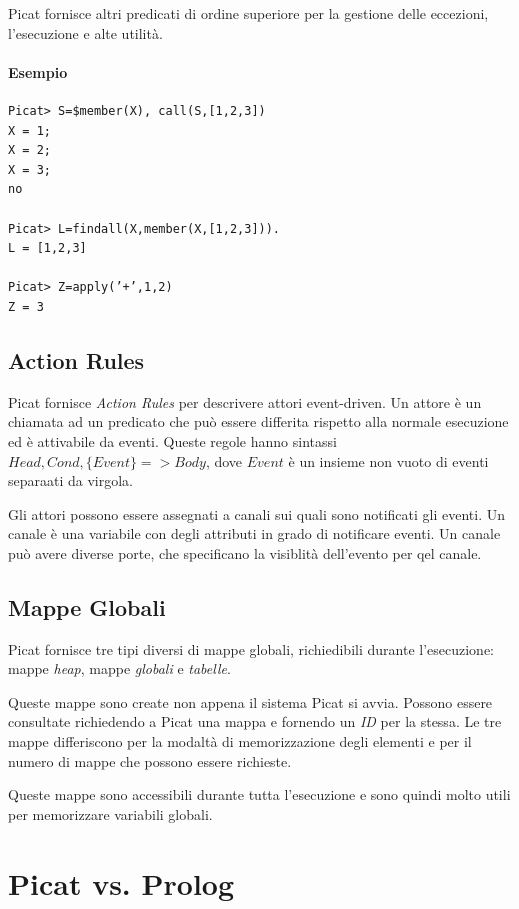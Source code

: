 \documentclass[12pt,a4paper,openright]{book} %
\begin{document}
Picat fornisce altri predicati di ordine superiore per la gestione delle eccezioni, l'esecuzione e alte utilità.

\paragraph{Esempio}
\begin{verbatim}
Picat> S=$member(X), call(S,[1,2,3])
X = 1;
X = 2;
X = 3;
no

Picat> L=findall(X,member(X,[1,2,3])).
L = [1,2,3]

Picat> Z=apply(’+’,1,2)
Z = 3
\end{verbatim}

\subsection{Action Rules}
\label{sec:picat_advanced_actionrules}

Picat fornisce \emph{Action Rules} per descrivere attori event-driven. Un attore è un chiamata ad un predicato che può essere differita rispetto alla normale esecuzione ed è attivabile da eventi. Queste regole hanno sintassi $Head, Cond, \{Event\} => Body$, dove $Event$ è un insieme non vuoto di eventi separaati da virgola.

Gli attori possono essere assegnati a canali sui quali sono notificati gli eventi. Un canale è una variabile con degli attributi in grado di notificare eventi. Un canale può avere diverse porte, che specificano la visiblità dell'evento per qel canale. 

\subsection{Mappe Globali}
\label{sec:picat_advanced_globalmaps}

Picat fornisce tre tipi diversi di mappe globali, richiedibili durante l'esecuzione: mappe \emph{heap}, mappe \emph{globali} e \emph{tabelle}.

Queste mappe sono create non appena il sistema Picat si avvia. Possono essere consultate richiedendo a Picat una mappa e fornendo un \emph{ID} per la stessa. Le tre mappe differiscono per la modaltà di memorizzazione degli elementi e per il numero di mappe che possono essere richieste.

Queste mappe sono accessibili durante tutta l'esecuzione e sono quindi molto utili per memorizzare variabili globali.

\section{Picat vs. Prolog}
\label{sec:picat_picatvsprolog}
\end{document}
